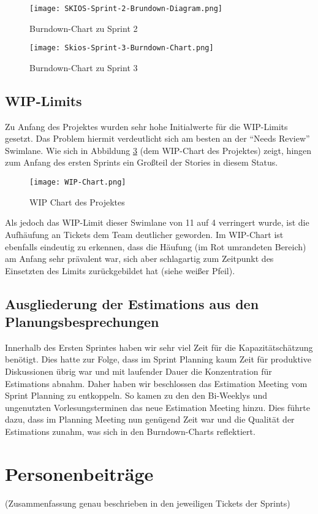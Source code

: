 \begin{figure}[H]
    \texttt{[image: SKIOS-Sprint-2-Brundown-Diagram.png]}
    \caption{Burndown-Chart zu Sprint 2}
    \label{fig:SKIOS-Sprint-2-Burndown}
\end{figure}

\begin{figure}
    \texttt{[image: Skios-Sprint-3-Burndown-Chart.png]}
    \caption{Burndown-Chart zu Sprint 3}
    \label{fig:SKIOS-Sprint-3-Burndown}
\end{figure}

\subsection{WIP-Limits}
Zu Anfang des Projektes wurden sehr hohe Initialwerte für die \ac{WIP}-Limits gesetzt.
Das Problem hiermit verdeutlicht sich am besten an der \enquote{Needs Review} Swimlane.
Wie sich in Abbildung \ref{fig:WIP} (dem \ac{WIP}-Chart des Projektes) zeigt, hingen zum Anfang des ersten Sprints ein Großteil der Stories in diesem Status.

\begin{figure}
    \centering
    \texttt{[image: WIP-Chart.png]}
    \caption{WIP Chart des Projektes}
    \label{fig:WIP}
\end{figure}

Als jedoch das \ac{WIP}-Limit dieser Swimlane von 11 auf 4 verringert wurde, ist die Aufhäufung an Tickets dem Team deutlicher geworden.
Im \ac{WIP}-Chart ist ebenfalls eindeutig zu erkennen, dass die Häufung (im Rot umrandeten Bereich) am Anfang sehr prävalent war, sich aber schlagartig zum Zeitpunkt des Einsetzten des Limits zurückgebildet hat (siehe weißer Pfeil).


\subsection{Ausgliederung der Estimations aus den Planungsbesprechungen}

Innerhalb des Ersten Sprintes haben wir sehr viel Zeit für die Kapazitätschätzung benötigt. 
Dies hatte zur Folge, dass im Sprint Planning kaum Zeit für produktive Diskussionen übrig war und mit laufender Dauer die Konzentration für Estimations abnahm.
Daher haben wir beschlossen das Estimation Meeting vom Sprint Planning zu entkoppeln.
So kamen zu den den Bi-Weeklys und ungenutzten Vorlesungsterminen das neue Estimation Meeting hinzu.
Dies führte dazu, dass im Planning Meeting nun genügend Zeit war und die Qualität der Estimations zunahm, was sich in den Burndown-Charts reflektiert.

\section{Personenbeiträge}
(Zusammenfassung genau beschrieben in den jeweiligen Tickets der Sprints)